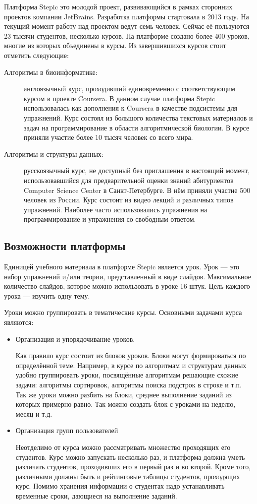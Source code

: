 \documentclass{matmex-diploma-custom}
\begin{document}
Платформа Stepic \cite{stepic} это молодой проект, развивающийся в
рамках сторонних проектов компании JetBrains. Разработка платформы
стартовала в 2013 году. На текущий момент работу над проектом ведут
семь человек. Сейчас её пользуются 23 тысячи студентов, несколько
курсов. На платформе создано более 400 уроков, многие из которых
объединены в курсы. Из завершившихся курсов стоит отметить следующие:

\begin{description}
\item[Алгоритмы в биоинформатике:] англоязычный курс, проходивший
  единовременно с соответствующим курсом в проекте Coursera. В данном
  случае платформа Stepic использовалась как дополнения к Coursera в
  качестве подсистемы для упражнений. Курс состоял из большого
  количества текстовых материалов и задач на программирование в
  области алгоритмической биологии. В курсе приняли участие более 10
  тысяч человек со всего мира.

\item[Алгоритмы и структуры данных:] русскоязычный курс, не доступный
  без приглашения в настоящий момент, использовавшийся для
  предварительной оценки знаний абитуриентов Computer Science Center в
  Санкт-Петербурге. В нём приняли участие 500 человек из России. Курс
  состоит из видео лекций и различных типов упражнений. Наиболее часто
  использовались упражнения на программирование и упражнения со
  свободным ответом.
\end{description}

\subsection{Возможности платформы}
Единицей учебного материала в платформе Stepic является урок. Урок ---
это набор упражнений и/или теории, представленный в виде
слайдов. Максимальное количество слайдов, которое можно использовать в
уроке 16 штук. Цель каждого урока --- изучить одну тему.

Уроки можно группировать в тематические курсы. Основными задачами
курса являются:
\begin{itemize}
\item Организация и упорядочивание уроков.

  Как правило курс состоит из блоков уроков. Блоки могут формироваться
  по определённой теме. Например, в курсе по алгоритмам и структурам
  данных удобно группировать уроки, посвящённые алгоритмам решающие
  схожие задачи: алгоритмы сортировок, алгоритмы поиска подстрок в
  строке и т.п. Так же уроки можно разбить на блоки, среднее
  выполнение заданий из которых примерно равно. Так можно создать блок
  с уроками на неделю, месяц и т.д.
\item Организация групп пользователей

  Неотделимо от курса можно рассматривать множество проходящих его
  студентов. Курс можно запускать несколько раз, и платформа должна
  уметь различать студентов, проходивших его в первый раз и во
  второй. Кроме того, различными должны быть и рейтинговые таблицы
  студентов, проходящих курс. Помимо хранения информации о студентах
  надо устанавливать временные сроки, дающиеся на выполнение заданий.
\end{itemize}
\end{document}
